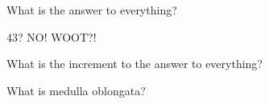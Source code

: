\documentclass[12pt]{article}
\begin{document}
\begin{myexercise}
    What is the answer to everything?
\end{myexercise}

43?
NO!
WOOT?!

\begin{myexercise}
    What is the increment to the answer to everything?
\end{myexercise}

What is medulla oblongata?
\end{document}

